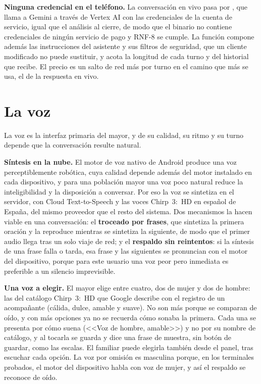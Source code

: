 \textbf{Ninguna credencial en el teléfono.} La conversación en vivo pasa por , que llama a Gemini a través de Vertex AI con las credenciales de la cuenta de servicio, igual que el análisis al cierre, de modo que el binario no contiene credenciales de ningún servicio de pago y RNF-8 se cumple. La función compone además las instrucciones del asistente y sus filtros de seguridad, que un cliente modificado no puede sustituir, y acota la longitud de cada turno y del historial que recibe. El precio es un salto de red más por turno en el camino que más se usa, el de la respuesta en vivo.


\section{La voz}
\label{sec:voz}

La voz es la interfaz primaria del mayor, y de su calidad, su ritmo y su turno depende que la conversación resulte natural.

\textbf{Síntesis en la nube.} El motor de voz nativo de Android produce una voz perceptiblemente robótica, cuya calidad depende además del motor instalado en cada dispositivo, y para una población mayor una voz poco natural reduce la inteligibilidad y la disposición a conversar. Por eso la voz se sintetiza en el servidor, con Cloud Text-to-Speech y las voces Chirp~3:~HD en español de España, del mismo proveedor que el resto del sistema. Dos mecanismos la hacen viable en una conversación: el \textbf{troceado por frases}, que sintetiza la primera oración y la reproduce mientras se sintetiza la siguiente, de modo que el primer audio llega tras un solo viaje de red; y el \textbf{respaldo sin reintentos}: si la síntesis de una frase falla o tarda, esa frase y las siguientes se pronuncian con el motor del dispositivo, porque para este usuario una voz peor pero inmediata es preferible a un silencio imprevisible.

\textbf{Una voz a elegir.} El mayor elige entre cuatro, dos de mujer y dos de hombre: las del catálogo Chirp~3:~HD que Google describe con el registro de un acompañante (cálida, dulce, amable y suave). No son más porque se comparan de oído, y con más opciones ya no se recuerda cómo sonaba la primera. Cada una se presenta por cómo suena (<<Voz de hombre, amable>>) y no por su nombre de catálogo, y al tocarla se guarda y dice una frase de muestra, sin botón de guardar, como las escalas. El familiar puede elegirla también desde el panel, tras escuchar cada opción. La voz por omisión es masculina porque, en los terminales probados, el motor del dispositivo habla con voz de mujer, y así el respaldo se reconoce de oído.

